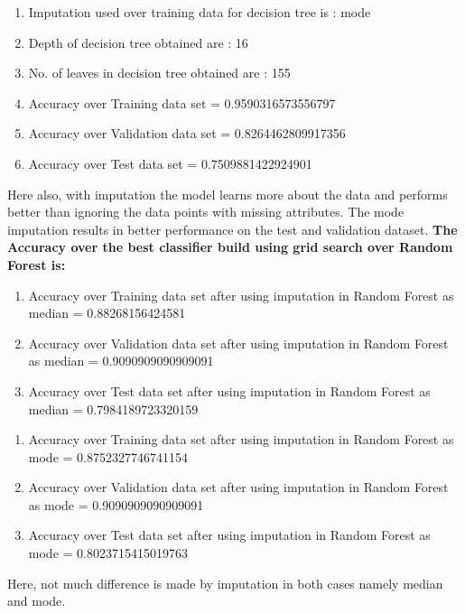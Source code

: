 \documentclass[11pt]{article}
\begin{document}
\begin{enumerate}
\item Imputation used over training data for decision tree is : mode
\item Depth of decision tree obtained are : 16
\item No. of leaves in decision tree obtained are : 155
\item Accuracy over Training data set = 0.9590316573556797
\item Accuracy over Validation data set = 0.8264462809917356
\item Accuracy over Test data set = 0.7509881422924901
\end{enumerate}
Here also, with imputation the model learns more about the data and performs better than ignoring the data points with missing attributes. The mode imputation results in better performance on the test and validation dataset.
\vspace{3mm}
\hline
\vspace{3mm}
\textbf{The Accuracy over the best classifier build using grid search over Random Forest is:}
\begin{enumerate}
\item Accuracy over Training data set after using imputation in Random Forest as median = 0.88268156424581
\item Accuracy over Validation data set after using imputation in Random Forest as median = 0.9090909090909091
\item Accuracy over Test data set after using imputation in Random Forest as median = 0.7984189723320159
\end{enumerate}
\hline
\begin{enumerate}
\item Accuracy over Training data set after using imputation in Random Forest as mode = 0.8752327746741154
\item Accuracy over Validation data set after using imputation in Random Forest as mode = 0.9090909090909091
\item Accuracy over Test data set after using imputation in Random Forest as mode = 0.8023715415019763
\end{enumerate}
Here, not much difference is made by imputation in both cases namely median and mode.
\end{document}

